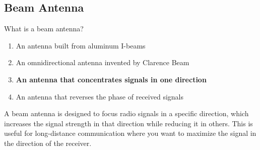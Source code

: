 \subsection{Beam Antenna}
\label{T9A01}

\begin{tcolorbox}[colback=gray!10!white,colframe=black!75!black,title=T9A01]
What is a beam antenna?
\begin{enumerate}[noitemsep]
    \item An antenna built from aluminum I-beams
    \item An omnidirectional antenna invented by Clarence Beam
    \item \textbf{An antenna that concentrates signals in one direction}
    \item An antenna that reverses the phase of received signals
\end{enumerate}
\end{tcolorbox}

A beam antenna is designed to focus radio signals in a specific direction, which increases the signal strength in that direction while reducing it in others. This is useful for long-distance communication where you want to maximize the signal in the direction of the receiver.
